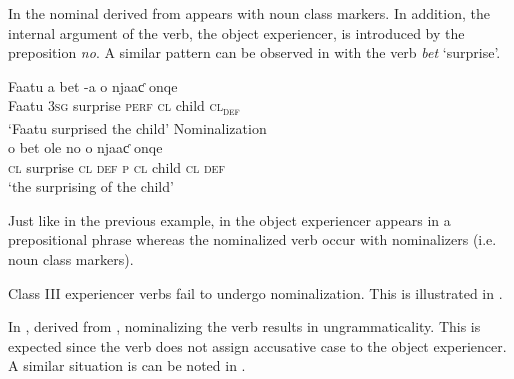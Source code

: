 \documentclass[output=paper]{langscibook}
\begin{document}
In  the  nominal derived from  appears with noun class markers. In addition, the internal argument of the verb, the object experiencer, is introduced by the preposition \textit{no}.  A similar pattern can be observed in  with the verb \textit{bet} `surprise'.

\ea \label{ex:tamba:15}
\ea \label{ex:tamba:15a}
\gll Faatu a      bet    {}-a        o        njaaƈ onqe\\
Faatu \textsc{3sg}  surprise \textsc{perf}   \textsc{cl}     child   \textsc{cl\textsubscript{def}} \\
\glt `Faatu surprised the child'
\ex Nominalization\\ \label{ex:tamba:15b}
\gll o     bet        ole      no o    njaaƈ   onqe\\
\textsc{cl}   surprise  \textsc{cl\textsubscript{} \textsc{def}}   \textsc{p}  \textsc{cl}  child     \textsc{cl\textsubscript{} \textsc{def}}\\
\glt `the surprising of the child'
\z
\z

Just like in the previous example, in  the object experiencer appears in a prepositional phrase whereas the nominalized verb occur with nominalizers (i.e. noun class markers). 

 Class III experiencer verbs fail to undergo nominalization. This  is illustrated in .


\ea \label{ex:tamba:16}
\label{ex:tamba:16a}
\label{ex:tamba:16b}
\z
\z
 
In , derived from , nominalizing the verb results in ungrammaticality. This is expected since the verb does not assign accusative case to the object experiencer. A similar situation is can be noted in .

\ea \label{ex:tamba:17}
\label{ex:tamba:17a}
\label{ex:tamba:17b}
\z
\z
\end{document}
